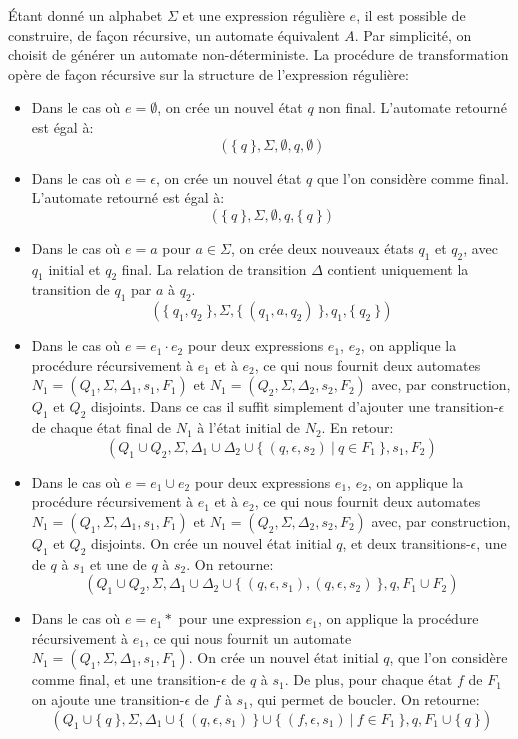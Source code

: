 Étant donné un alphabet $\Sigma$ et une expression régulière $e$, il est possible de construire, de façon récursive, un automate équivalent $A$.
Par simplicité, on choisit de générer un automate non-déterministe.
La procédure de transformation opère de façon récursive sur la structure de l'expression régulière:
\begin{itemize}
\item Dans le cas où $e = \emptyset$, on crée un nouvel état $q$ non final. L'automate retourné est égal à:
\[
(\{\ q\ \}, \Sigma, \emptyset, q, \emptyset)
\] 
\item Dans le cas où $e = \epsilon$, on crée un nouvel état $q$ que l'on considère comme final. L'automate retourné est égal à:
\[
(\{\ q\ \}, \Sigma, \emptyset, q, \{\ q\ \})
\]
\item Dans le cas où $e = a$ pour $a \in \Sigma$, on crée deux nouveaux états $q_1$ et $q_2$, avec $q_1$ initial et $q_2$ final.
La relation de transition $\Delta$ contient uniquement la transition de $q_1$ par $a$ à $q_2$.
\[
(\{\ q_1, q_2\ \}, \Sigma, \{\ (q_1, a, q_2)\ \}, q_1, \{\ q_2\ \})
\]
\item Dans le cas où $e = e_1 \cdot e_2$ pour deux expressions $e_1$, $e_2$, on applique la procédure récursivement à $e_1$ et à $e_2$, ce qui nous fournit deux automates $N_1 = (Q_1, \Sigma, \Delta_1, s_1, F_1)$ et $N_1 = (Q_2, \Sigma, \Delta_2, s_2, F_2)$ avec, par construction, $Q_1$ et $Q_2$ disjoints. Dans ce cas il suffit simplement d'ajouter une transition-$\epsilon$ de chaque état final de $N_1$ à l'état initial de $N_2$. En retour:
\[
(Q_1 \cup Q_2, \Sigma, \Delta_1 \cup \Delta_2 \cup \{\ (q, \epsilon, s_2)\ |\ q \in F_1\ \}, s_1, F_2)
\]
\item Dans le cas où $e = e_1 \cup e_2$ pour deux expressions $e_1$, $e_2$, on applique la procédure récursivement à $e_1$ et à $e_2$, ce qui nous fournit deux automates $N_1 = (Q_1, \Sigma, \Delta_1, s_1, F_1)$ et $N_1 = (Q_2, \Sigma, \Delta_2, s_2, F_2)$ avec, par construction, $Q_1$ et $Q_2$ disjoints.
On crée un nouvel état initial $q$, et deux transitions-$\epsilon$, une de $q$ à $s_1$ et une de $q$ à $s_2$. On retourne:
\[
(Q_1 \cup Q_2, \Sigma, \Delta_1 \cup \Delta_2 \cup \{\ (q, \epsilon, s_1), (q, \epsilon, s_2)\ \}, q, F_1 \cup F_2)
\]
\item Dans le cas où $e = e_1*$ pour une expression $e_1$, on applique la procédure récursivement à $e_1$, ce qui nous fournit un automate $N_1 = (Q_1, \Sigma, \Delta_1, s_1, F_1)$.
On crée un nouvel état initial $q$, que l'on considère comme final, et une transition-$\epsilon$ de $q$ à $s_1$. De plus, pour chaque état $f$ de $F_1$ on ajoute une transition-$\epsilon$ de $f$ à $s_1$, qui permet de boucler. On retourne:
\[
(Q_1 \cup \{\ q\ \}, \Sigma, \Delta_1 \cup \{\ (q, \epsilon, s_1)\ \} \cup \{\ (f, \epsilon, s_1)\ |\ f \in F_1\ \}, q, F_1 \cup \{\ q\ \})
\]
\end{itemize}

